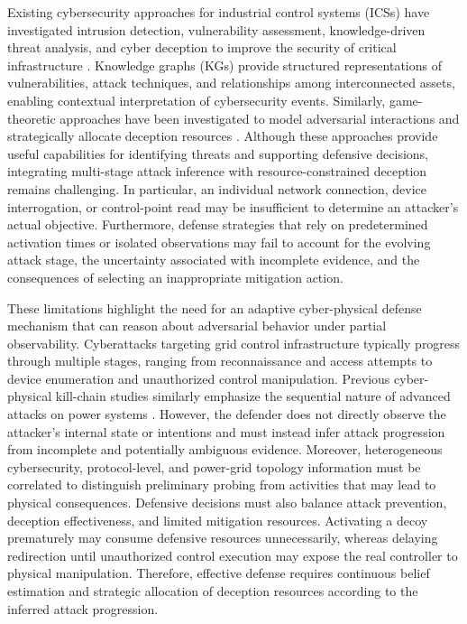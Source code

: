 \documentclass[10pt,conference]{IEEEtran}
\begin{document}
Existing cybersecurity approaches for industrial control systems (ICSs) have investigated intrusion detection, vulnerability assessment, knowledge-driven threat analysis, and cyber deception to improve the security of critical infrastructure \cite{neupane2025ibr}. Knowledge graphs (KGs) provide structured representations of vulnerabilities, attack techniques, and relationships among interconnected assets, enabling contextual interpretation of cybersecurity events. Similarly, game-theoretic approaches have been investigated to model adversarial interactions and strategically allocate deception resources \cite{horak2019honeypots,neupane2025ransomware}. Although these approaches provide useful capabilities for identifying threats and supporting defensive decisions, integrating multi-stage attack inference with resource-constrained deception remains challenging. In particular, an individual network connection, device interrogation, or control-point read may be insufficient to determine an attacker's actual objective. Furthermore, defense strategies that rely on predetermined activation times or isolated observations may fail to account for the evolving attack stage, the uncertainty associated with incomplete evidence, and the consequences of selecting an inappropriate mitigation action.

These limitations highlight the need for an adaptive cyber-physical defense mechanism that can reason about adversarial behavior under partial observability. Cyberattacks targeting grid control infrastructure typically progress through multiple stages, ranging from reconnaissance and access attempts to device enumeration and unauthorized control manipulation. Previous cyber-physical kill-chain studies similarly emphasize the sequential nature of advanced attacks on power systems \cite{Presekal2024KC}. However, the defender does not directly observe the attacker's internal state or intentions and must instead infer attack progression from incomplete and potentially ambiguous evidence. Moreover, heterogeneous cybersecurity, protocol-level, and power-grid topology information must be correlated to distinguish preliminary probing from activities that may lead to physical consequences. Defensive decisions must also balance attack prevention, deception effectiveness, and limited mitigation resources. Activating a decoy prematurely may consume defensive resources unnecessarily, whereas delaying redirection until unauthorized control execution may expose the real controller to physical manipulation. Therefore, effective defense requires continuous belief estimation and strategic allocation of deception resources according to the inferred attack progression.
\end{document}
